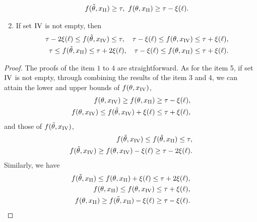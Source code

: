 \begin{claim}
\begin{enumerate}
\begin{align*}
			f(\tilde{\theta},x_{\mathrm{\Rnum{2}}})\geq \tau,\ f(\theta,x_{\mathrm{\Rnum{2}}})\geq \tau-\xi(\ell).
		\end{align*}
		\item If set $ \mathrm{\Rnum{4}} $ is not empty, then
		\begin{align*}
			\tau - 2\xi(\ell) \leq f(\tilde{\theta},x_{\mathrm{\Rnum{4}}})\leq \tau,\quad
			\tau -\xi(\ell)\leq f(\theta,x_{\mathrm{\Rnum{4}}})\leq \tau+\xi(\ell),\\
			\tau \leq f(\tilde{\theta},x_{\mathrm{\Rnum{2}}})\leq \tau+2\xi(\ell),\quad
			\tau -\xi(\ell) \leq f(\theta,x_{\mathrm{\Rnum{2}}})\leq \tau+\xi(\ell).
		\end{align*}
	\end{enumerate}
	
\end{claim}

\begin{proof}
	The proofs of the item $ 1$ to $ 4 $ are straightforward. As for the item 5, if set $ \mathrm{\Rnum{4}} $ is not empty, through combining the results of the item 3 and 4, we can attain the lower and upper bounds of $ f(\theta,x_{\mathrm{\Rnum{4}}}) $, 
	\begin{align*}
		f(\theta,x_{\mathrm{\Rnum{4}}})\geq f(\theta,x_{\mathrm{\Rnum{2}}})\geq \tau-\xi(\ell),\\
		f(\theta,x_{\mathrm{\Rnum{4}}})\leq f(\tilde{\theta},x_{\mathrm{\Rnum{4}}})+\xi(\ell)\leq \tau+\xi(\ell),
	\end{align*}
	and those of $ f(\tilde{\theta},x_{\mathrm{\Rnum{4}}}) $,
	\begin{align*}
	    f(\tilde{\theta},x_{\mathrm{\Rnum{4}}})\leq f(\tilde{\theta},x_{\mathrm{\Rnum{2}}})\leq \tau, \\
	    f(\tilde{\theta},x_{\mathrm{\Rnum{4}}})\geq 	f(\theta,x_{\mathrm{\Rnum{4}}})-\xi(\ell)\geq \tau-2\xi(\ell). 
	\end{align*}
	Similarly, we have
	\begin{align*}
	f(\tilde{\theta},x_{\mathrm{\Rnum{2}}})\leq f(\theta,x_{\mathrm{\Rnum{2}}})+\xi(\ell) \leq \tau+2\xi(\ell),\\
		f(\theta,x_{\mathrm{\Rnum{2}}})\leq f(\theta,x_{\mathrm{\Rnum{4}}})\leq \tau+\xi(\ell),\\
		f(\theta,x_{\mathrm{\Rnum{2}}})\geq f(\tilde{\theta},x_{\mathrm{\Rnum{2}}})-\xi(\ell)\geq \tau-\xi(\ell).
	\end{align*}
\end{proof}

